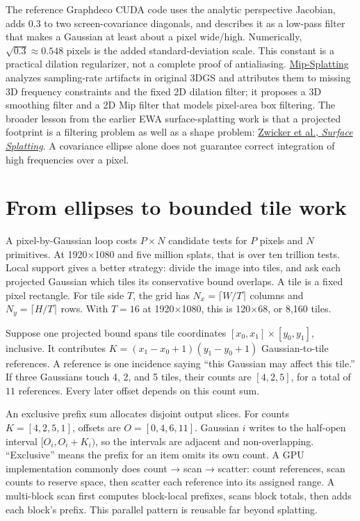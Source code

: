 The reference Graphdeco CUDA code uses the analytic perspective Jacobian, adds \(0.3\) to two screen-covariance diagonals, and describes it as a low-pass filter that makes a Gaussian at least about a pixel wide/high. Numerically, \(\sqrt{0.3}\approx0.548\) pixels is the added standard-deviation scale. This constant is a practical dilation regularizer, not a complete proof of antialiasing. \href{https://openaccess.thecvf.com/content/CVPR2024/html/Yu_Mip-Splatting_Alias-free_3D_Gaussian_Splatting_CVPR_2024_paper.html}{Mip-Splatting} analyzes sampling-rate artifacts in original 3DGS and attributes them to missing 3D frequency constraints and the fixed 2D dilation filter; it proposes a 3D smoothing filter and a 2D Mip filter that models pixel-area box filtering. The broader lesson from the earlier EWA surface-splatting work is that a projected footprint is a filtering problem as well as a shape problem: \href{https://www.cs.princeton.edu/courses/archive/spr01/cs598b/papers/zwicker01.pdf}{Zwicker et al., \emph{Surface Splatting}}. A covariance ellipse alone does not guarantee correct integration of high frequencies over a pixel.

\section{From ellipses to bounded tile work}\label{04-visual-computing-ii-ch037-from-ellipses-to-bounded-tile-work}

A pixel-by-Gaussian loop costs \(P\times N\) candidate tests for \(P\) pixels and \(N\) primitives. At 1920×1080 and five million splats, that is over ten trillion tests. Local support gives a better strategy: divide the image into tiles, and ask each projected Gaussian which tiles its conservative bound overlaps. A tile is a fixed pixel rectangle. For tile side \(T\), the grid has \(N_x=\lceil W/T\rceil\) columns and \(N_y=\lceil H/T\rceil\) rows. With \(T=16\) at 1920×1080, this is 120×68, or 8,160 tiles.

Suppose one projected bound spans tile coordinates \([x_0,x_1]\times[y_0,y_1]\), inclusive. It contributes \(K=(x_1-x_0+1)(y_1-y_0+1)\) Gaussian-to-tile references. A reference is one incidence saying ``this Gaussian may affect this tile.'' If three Gaussians touch 4, 2, and 5 tiles, their counts are \([4,2,5]\), for a total of \(11\) references. Every later offset depends on this count sum.

An exclusive prefix sum allocates disjoint output slices. For counts \(K=[4,2,5,1]\), offsets are \(O=[0,4,6,11]\). Gaussian \(i\) writes to the half-open interval \([O_i,O_i+K_i)\), so the intervals are adjacent and non-overlapping. ``Exclusive'' means the prefix for an item omits its own count. A GPU implementation commonly does count → scan → scatter: count references, scan counts to reserve space, then scatter each reference into its assigned range. A multi-block scan first computes block-local prefixes, scans block totals, then adds each block's prefix. This parallel pattern is reusable far beyond splatting.

